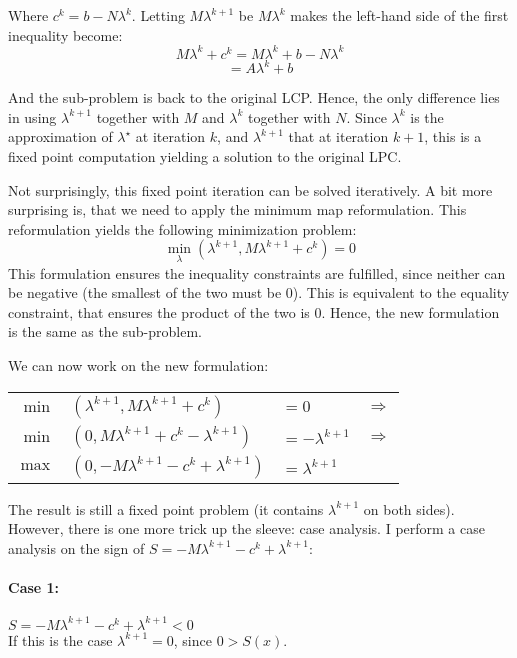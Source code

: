 \documentclass[10pt,oneside,a4paper,final,english]{memoir}
\begin{document}
Where $c^k = b - N\lambda^k$. Letting $M\lambda^{k+1}$ be $M\lambda^k$
makes the left-hand side of the first inequality become:
\[ M \lambda^k + c^k = M\lambda^k + b - N\lambda^k \]
\[ = A\lambda^k + b\]

And the sub-problem is back to the original LCP. Hence, the only
difference lies in using $\lambda^{k+1}$ together with $M$ and
$\lambda^k$ together with $N$. Since $\lambda^k$ is the approximation
of $\lambda^\star$ at iteration $k$, and $\lambda^{k+1}$ that at
iteration $k+1$, this is a fixed point computation yielding a solution
to the original LPC.

Not surprisingly, this fixed point iteration can be solved
iteratively. A bit more surprising is, that we need to apply the
minimum map reformulation. This reformulation yields the following
minimization problem:
\[ \min_\lambda (\lambda^{k+1}, M\lambda^{k+1} + c^k) = 0 \]
This formulation ensures the inequality constraints are fulfilled,
since neither can be negative (the smallest of the two must be
$0$). This is equivalent to the equality constraint, that ensures the
product of the two is $0$. Hence, the new formulation is the same
as the sub-problem.

We can now work on the new formulation:
\begin{center}\begin{tabular}{rlll}
    $ \min $ & $(\lambda^{k+1}, M\lambda^{k+1} + c^k)$&
    $ = 0 $ & $\Rightarrow $ \\

    $ \min $ & $(0, M\lambda^{k+1} + c^k - \lambda^{k+1}) $&
    $= -\lambda^{k+1} $ & $\Rightarrow $ \\

    $ \max $ & $(0, - M\lambda^{k+1} - c^k + \lambda^{k+1}) $&
    $= \lambda^{k+1} $ &
\end{tabular}\end{center}

The result is still a fixed point problem (it contains $\lambda^{k+1}$
on both sides). However, there is one more trick up the sleeve: case
analysis. I perform a case analysis on the sign of $S =
-M\lambda^{k+1} - c^k + \lambda^{k+1}$:

\paragraph{Case 1: } $S = -M\lambda^{k+1}-c^k+\lambda^{k+1} < 0$\\
If this is the case $\lambda^{k+1} = 0$, since $0 > S(x)$.
\end{document}
